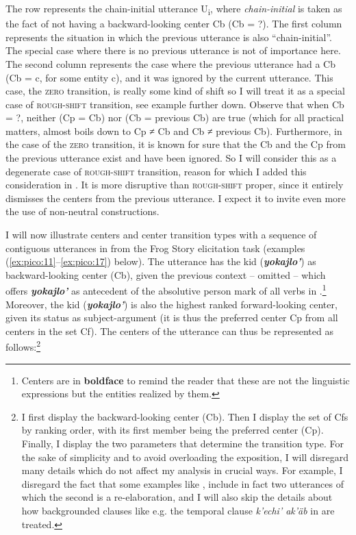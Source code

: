 \documentclass[output=paper
,modfonts
,nonflat]{langsci/langscibook}
\begin{document}
The row represents the chain-initial utterance U\textsubscript{i}, where \textit{chain-initial} is taken as the fact of not having a backward-looking center Cb (Cb = ?). The first column represents the situation in which the previous utterance is also ``chain-initial''. The special case where there is no previous utterance is not of importance here. The second column represents the case where the previous utterance had a Cb (Cb = c, for some entity c), and it was ignored by the current utterance. This case, the \textsc{zero} transition, is really some kind of shift so I will treat it as a special case of \textsc{rough-shift} transition, see example  further down. Observe that when Cb = ?, neither (Cp = Cb) nor (Cb = previous Cb) are true (which for all practical matters, almost boils down to Cp ≠ Cb and Cb ≠ previous Cb). Furthermore, in the case of the \textsc{zero} transition, it is known for sure that the Cb and the Cp from the previous utterance exist and have been ignored. So I will consider this as a degenerate case of \textsc{rough-shift} transition, reason for which I added this consideration in . It is more disruptive than \textsc{rough-shift} proper, since it entirely dismisses the centers from the previous utterance. I expect it to invite even more the use of non-neutral constructions.


I will now illustrate centers and center transition types with a sequence of contiguous utterances in  from the Frog Story elicitation task (examples (\ref{ex:pico:11}--\ref{ex:pico:17}) below). The utterance  has the kid (\textbf{\textit{yokajlo'}}) as backward-looking center (Cb), given the previous context -- omitted -- which offers \textbf{\textit{yokajlo'}} as antecedent of the absolutive person mark of all verbs in .\footnote{Centers are in \textbf{boldface} to remind the reader that these are not the linguistic expressions but the entities realized by them.} Moreover, the kid (\textbf{\textit{yokajlo'}}) is also the highest ranked forward-looking center, given its status as subject-argument (it is thus the preferred center Cp from all centers in the set Cf). The centers of the utterance  can thus be represented as follows:\footnote{I first display the backward-looking center (Cb). Then I display the set of Cfs by ranking order, with its first member being the preferred center (Cp). Finally, I display the two parameters that determine the transition type. For the sake of simplicity and to avoid overloading the exposition, I will disregard many details which do not affect my analysis in crucial ways. For example, I disregard the fact that some examples like , include in fact two utterances of which the second is a re-elaboration, and I will also skip the details about how backgrounded clauses like e.g. the temporal clause \textit{k'echi' ak'äb} in  are treated.}\pagebreak
\end{document}

